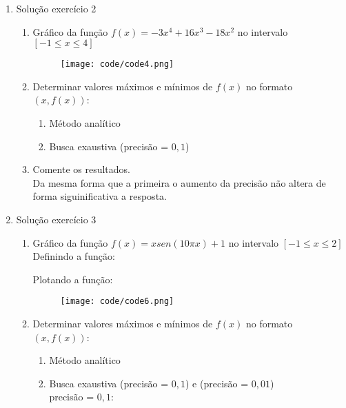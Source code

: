 \documentclass[a4paper, 12pt]{article}
\begin{document}
\begin{enumerate}
   \item Solução exercício 2
   \begin{enumerate}
		\item Gráfico da função $f(x) = -3x^{4}+16x^{3}-18x^{2}$ no intervalo $[-1 \leq x \leq 4]$

            

            \begin{figure}[h!]
                \begin{center}
                    \texttt{[image: code/code4.png]}
                \end{center}
            \end{figure}
		\item Determinar valores máximos e mínimos de $f(x)$ no formato $(x,f(x))$:
			\begin{enumerate}[{b}.1)]
				\item Método analítico
                    
                    
				\item Busca exaustiva (precisão = $0,1$)
                    
            \end{enumerate}
        \item Comente os resultados.
            \\
            Da mesma forma que a primeira o aumento da precisão
            não altera de forma siguinificativa a resposta.
   \end{enumerate}

   \item Solução exercício 3
   \begin{enumerate}
		\item Gráfico da função $f(x) = x sen(10\pi x) + 1$ no intervalo $[-1 \leq x \leq 2]$
            \\
            Definindo a função:
            

            Plotando a função:
            

            \begin{figure}[h!]
                \begin{center}
                    \texttt{[image: code/code6.png]}
                \end{center}
            \end{figure}
		\item Determinar valores máximos e mínimos de $f(x)$ no formato $(x,f(x))$:
			\begin{enumerate}[{b}.1)]
				\item Método analítico
				\item Busca exaustiva (precisão = $0,1$) e (precisão = $0,01$)
                    \\
                    precisão = $0,1$:
                    


\end{enumerate}
\end{enumerate}
\end{enumerate}
\end{document}
